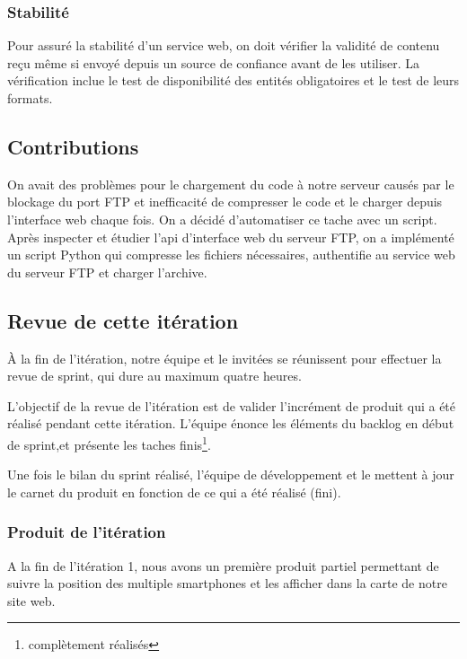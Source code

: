 \subsubsection{Stabilité}

Pour assuré la stabilité d'un service web, on doit vérifier la validité de
contenu reçu même si envoyé depuis un source de confiance avant de les
utiliser. La vérification inclue le test de disponibilité des entités
obligatoires et le test de leurs formats.


\subsection{Contributions}

On avait des problèmes pour le chargement du code à notre serveur causés par le
blockage du port FTP et inefficacité de compresser le code et le charger depuis
l'interface web chaque fois. On a décidé d'automatiser ce tache avec un script.
Après inspecter et étudier l'api d'interface web du serveur FTP, on a
implémenté un script Python qui compresse les fichiers nécessaires, authentifie
au service web du serveur FTP et charger l'archive.

\subsection{Revue de cette itération}

À la fin de l'itération, notre équipe et le  invitées
se réunissent pour effectuer la revue de sprint, qui dure au maximum quatre
heures.

L'objectif de la revue de l'itération est de valider l'incrément de produit qui
a été réalisé pendant cette itération.  L'équipe énonce les éléments du backlog
en début de sprint,et présente les taches finis\footnote{complètement
réalisés}.

Une fois le bilan du sprint réalisé, l'équipe de développement et le
 mettent à jour le carnet du produit en fonction de ce
qui a été réalisé (fini).

\subsubsection{Produit de l'itération}

A la fin de l'itération 1, nous avons un première produit partiel permettant de
suivre la position des multiple smartphones et les afficher dans la carte de
notre site web.

